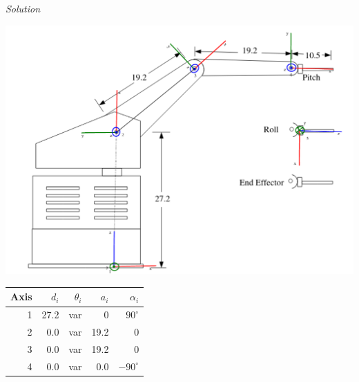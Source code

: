 \documentclass{article}
\numberwithin{prob}{section}
\newenvironment{solution}{\emph{Solution}}{}
\begin{document}
\begin{solution}

\includegraphics[width=\linewidth]{media/labvolt.png.pdf}

\begin{tabular}{rrrrr}
  \toprule
  Axis & $d_i$ & $\theta_i$ & $a_i$ & $\alpha_i$ \\
  \midrule
  1 & 27.2 & var & 0 & $90^\circ$ \\
  2 &  0.0 & var & 19.2 & 0 \\
  3 &  0.0 & var & 19.2 & 0 \\
  4 &  0.0 & var &  0.0 & $-90^\circ$ \\
  \bottomrule
\end{tabular}
\end{solution}
\end{document}
